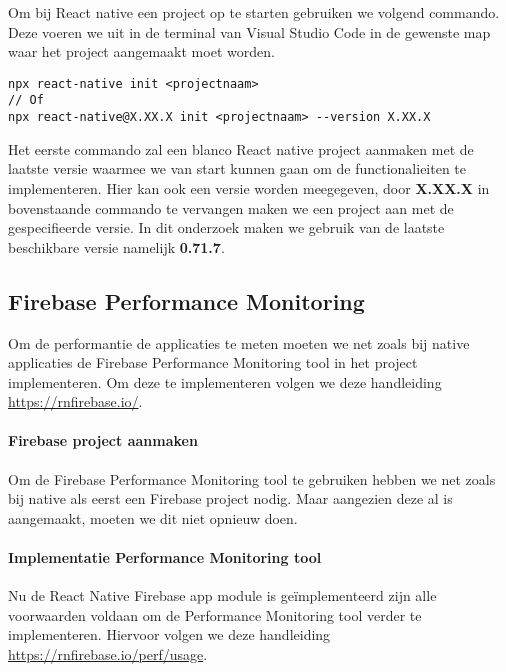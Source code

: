 Om bij React native een project op te starten gebruiken we volgend commando. 
Deze voeren we uit in de terminal van Visual Studio Code in de gewenste map waar 
het project aangemaakt moet worden.
\begin{verbatim}
npx react-native init <projectnaam>
// Of
npx react-native@X.XX.X init <projectnaam> --version X.XX.X
\end{verbatim}


Het eerste commando zal een blanco React native project aanmaken met de laatste versie 
waarmee we van start kunnen gaan om de functionalieiten te implementeren. Hier kan ook 
een versie worden meegegeven, door \textbf{X.XX.X} in bovenstaande commando te vervangen 
maken we een project aan met de gespecifieerde versie. In dit onderzoek maken we gebruik 
van de laatste beschikbare versie namelijk \textbf{0.71.7}.

\subsection{Firebase Performance Monitoring}
Om de performantie de applicaties te meten moeten we net zoals bij native applicaties de 
Firebase Performance Monitoring tool in het project implementeren. Om deze te implementeren 
volgen we deze handleiding \url{https://rnfirebase.io/}.

\paragraph{Firebase project aanmaken}
Om de Firebase Performance Monitoring tool te gebruiken hebben we net zoals bij native 
als eerst een Firebase project nodig. Maar aangezien deze al is aangemaakt, moeten we dit 
niet opnieuw doen.



\paragraph{Implementatie Performance Monitoring tool}
Nu de React Native Firebase app module is geïmplementeerd zijn alle voorwaarden voldaan om de 
Performance Monitoring tool verder te implementeren. Hiervoor volgen we deze handleiding 
\url{https://rnfirebase.io/perf/usage}.



